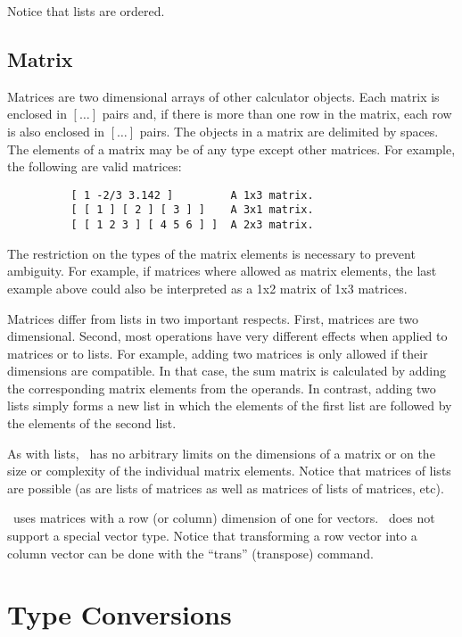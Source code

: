 \documentclass{report}
\begin{document}
Notice that lists are ordered.

\section{Matrix}

Matrices are two dimensional arrays of other calculator objects. Each matrix is enclosed in
$[\ldots]$ pairs and, if there is more than one row in the matrix, each row is also enclosed in
$[\ldots]$ pairs. The objects in a matrix are delimited by spaces. The elements of a matrix may
be of any type except other matrices. For example, the following are valid matrices:

\begin{verbatim}
          [ 1 -2/3 3.142 ]         A 1x3 matrix.
          [ [ 1 ] [ 2 ] [ 3 ] ]    A 3x1 matrix.
          [ [ 1 2 3 ] [ 4 5 6 ] ]  A 2x3 matrix.
\end{verbatim}

The restriction on the types of the matrix elements is necessary to prevent ambiguity. For
example, if matrices where allowed as matrix elements, the last example above could also be
interpreted as a 1x2 matrix of 1x3 matrices.

Matrices differ from lists in two important respects. First, matrices are two dimensional.
Second, most operations have very different effects when applied to matrices or to lists. For
example, adding two matrices is only allowed if their dimensions are compatible. In that case,
the sum matrix is calculated by adding the corresponding matrix elements from the operands. In
contrast, adding two lists simply forms a new list in which the elements of the first list are
followed by the elements of the second list.

As with lists, \CLAC\ has no arbitrary limits on the dimensions of a matrix or on the size or
complexity of the individual matrix elements. Notice that matrices of lists are possible (as are
lists of matrices as well as matrices of lists of matrices, etc).

\CLAC\ uses matrices with a row (or column) dimension of one for vectors. \CLAC\ does not
support a special vector type. Notice that transforming a row vector into a column vector can be
done with the ``trans'' (transpose) command.


\chapter{Type Conversions}
\end{document}
